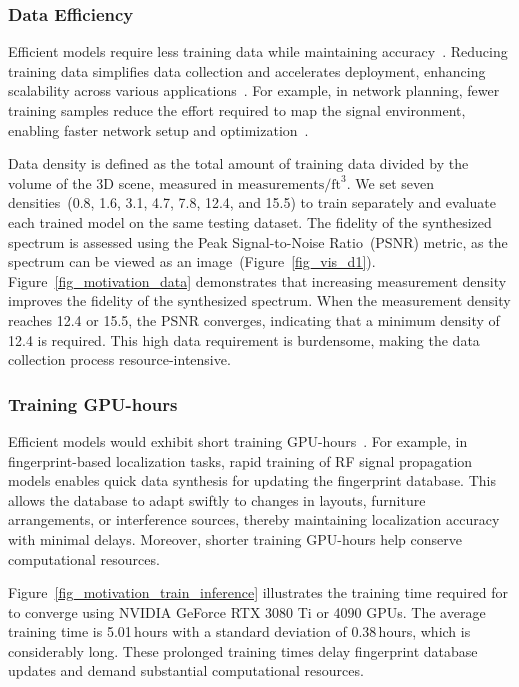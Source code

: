\subsubsection{Data Efficiency}
Efficient models require less training data while maintaining accuracy~\cite{han2015learning, hsieh2023distilling, karras2020training}.  
Reducing training data simplifies data collection and accelerates deployment, enhancing scalability across various applications~\cite{menghani2023efficient}.  
For example, in network planning, fewer training samples reduce the effort required to map the signal environment, enabling faster network setup and optimization~\cite{yin2022practical}.


Data density is defined as the total amount of training data divided by the volume of the 3D scene, measured in \(\text{measurements}/\text{ft}^3\).
We set seven densities~(0.8, 1.6, 3.1, 4.7, 7.8, 12.4, and 15.5) to train \nerft separately and evaluate each trained model on the same testing dataset.
The fidelity of the synthesized spectrum is assessed using the Peak Signal-to-Noise Ratio~(PSNR) metric, as the spectrum can be viewed as an image~(Figure~\ref{fig_vis_d1}).
Figure~\ref{fig_motivation_data} demonstrates that increasing measurement density improves the fidelity of the synthesized spectrum.  
When the measurement density reaches 12.4 or 15.5, the PSNR converges, indicating that a minimum density of 12.4 is required.  
This high data requirement is burdensome, making the data collection process resource-intensive.




\subsubsection{Training GPU-hours}
Efficient models would exhibit short training GPU-hours~\cite{neil2016learning, liu2020training, goyal2017accurate}. 
For example, in fingerprint-based localization tasks, rapid training of RF signal propagation models enables quick data synthesis for updating the fingerprint database.
This allows the database to adapt swiftly to changes in layouts, furniture arrangements, or interference sources, thereby maintaining localization accuracy with minimal delays.
Moreover, shorter training GPU-hours help conserve computational resources.


Figure~\ref{fig_motivation_train_inference} illustrates the training time required for \nerft to converge using NVIDIA GeForce RTX 3080 Ti or 4090 GPUs.  
The average training time is 5.01\,hours with a standard deviation of 0.38\,hours, which is considerably long.  
These prolonged training times delay fingerprint database updates and demand substantial computational resources.




